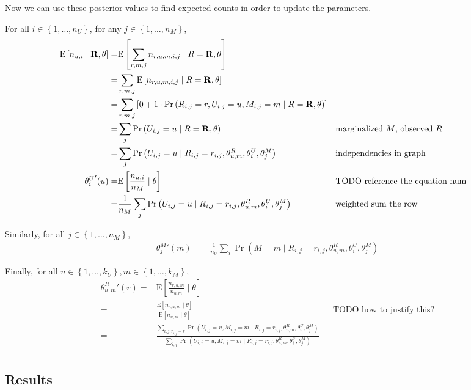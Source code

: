 \documentclass{article}
\newcommand{\E}    [2]{{ \textrm{E} \left[ #1 \mid #2 \right] }}
\newcommand{\PO}   [1]{{ \Pr \left( #1 \right) }}
\newcommand{\PP}   [2]{{ \PO{ #1 \mid #2 } }}
\newcommand{\mat}  [1]{{ \bf #1 }}
\newcommand{\range}[1]{{ \left\{ 1, \dots, #1 \right\} }}
\begin{document}
Now we can use these posterior values to find expected counts in order
to update the parameters.

For all $i \in \range{n_U}$, for any $j \in \range{n_M}$,
\begin{align}
  \E{n_{u,i}}{\mat{R}, \theta}
  =& \E{ \sum_{r,m,j} n_{r,u,m,i,j} }{R = \mat{R}, \theta} \\
  =& \sum_{r,m,j} \E{ n_{r,u,m,i,j} }{R = \mat{R}, \theta} \\
  =& \sum_{r,m,j} \left[
    0 + 1 \cdot \PP{ R_{i,j} = r, U_{i,j} = u, M_{i,j} = m }{R = \mat{R}, \theta}
  \right] \\
  =& \sum_j \PP{U_{i,j} = u}{R = \mat{R}, \theta}
  && \text{marginalized $M$, observed $R$} \\
  =& \sum_j \PP{U_{i,j} = u}{R_{i,j} = r_{i,j}, \theta^R_{u,m},
    \theta^U_i, \theta^M_j}
  && \text{independencies in graph} \\
  {\theta^U_i}'(u)
  =& \E{ \frac{ n_{u,i}}{ n_M } }{\theta} && \text{TODO reference the
    equation num} \\
  =& \frac{1}{n_M} \sum_j \PP{U_{i,j} = u}{ R_{i,j} = r_{i,j}, \theta^R_{u,m},
    \theta^U_i, \theta^M_j }
  && \text{weighted sum the row}
\end{align}

Similarly, for all $j \in \range{n_M}$,
\begin{align}
  {\theta^M_j}'(m) =&
  \frac{1}{n_U} \sum_i \PP{M = m}{
    R_{i,j} = r_{i,j}, \theta^R_{u,m}, \theta^U_i, \theta^M_j}
\end{align}

Finally, for all $u \in \range{k_U}, m \in \range{k_M}$,
\begin{align}
  {\theta^R_{u,m}}'(r)
  =& \E{ \frac{n_{r,u,m}}{n_{u,m}} }{\theta} \\
  =& \frac{ \E{n_{r,u,m} }{\theta} }{ \E{n_{u,m}}{\theta} }
  && \text{TODO how to justify this?} \\
  =& \frac{\sum_{i,j: r_{i,j} = r} \PP{U_{i,j} = u, M_{i,j} = m}{
      R_{i,j} = r_{i,j}, \theta^R_{u,m}, \theta^U_i, \theta^M_j}
  }{ \sum_{i,j} \PP{U_{i,j} = u, M_{i,j} = m}{
      R_{i,j} = r_{i,j}, \theta^R_{u,m}, \theta^U_i, \theta^M_j} } \\
\end{align}

\subsection{Results}
\end{document}
